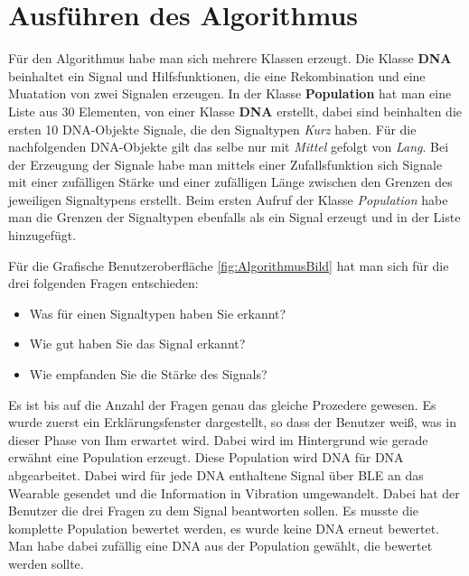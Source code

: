 \section {Ausf{\"u}hren des Algorithmus}


F{\"u}r den Algorithmus habe man sich mehrere Klassen erzeugt. 
Die Klasse \textbf{DNA} beinhaltet ein Signal und Hilfsfunktionen, die eine Rekombination und eine Muatation von zwei Signalen erzeugen.
In der Klasse \textbf{Population} hat man eine Liste aus 30 Elementen, von einer Klasse \textbf{DNA} erstellt, dabei sind beinhalten die ersten 10 DNA-Objekte Signale, die den Signaltypen \textit{Kurz} haben. F{\"u}r die nachfolgenden DNA-Objekte gilt das selbe nur mit \textit{Mittel} gefolgt von \textit{Lang}. 
Bei der Erzeugung der Signale habe man mittels einer Zufallsfunktion sich Signale mit einer zuf{\"a}lligen St{\"a}rke und einer zuf{\"a}lligen L{\"a}nge zwischen den Grenzen des jeweiligen Signaltypens erstellt. Beim ersten Aufruf der Klasse \textit{Population} habe man die Grenzen der Signaltypen ebenfalls als ein Signal erzeugt und in der Liste hinzugef{\"u}gt.

F{\"u}r die Grafische Benutzeroberfl{\"a}che \autoref{fig:AlgorithmusBild} hat man sich f{\"u}r die drei folgenden Fragen entschieden:
\begin{itemize}
\item Was f{\"u}r einen Signaltypen haben Sie erkannt?
\item Wie gut haben Sie das Signal erkannt?
\item Wie empfanden Sie die St{\"a}rke des Signals?
\end{itemize}

Es ist bis auf die Anzahl der Fragen genau das gleiche Prozedere gewesen. Es wurde zuerst ein Erkl{\"a}rungsfenster dargestellt, so dass der Benutzer wei{\ss}, was in dieser Phase von Ihm erwartet wird. 
Dabei wird im Hintergrund wie gerade erw{\"a}hnt eine Population erzeugt. Diese Population wird DNA f{\"u}r DNA abgearbeitet. Dabei wird f{\"u}r jede DNA enthaltene Signal {\"u}ber BLE an das Wearable gesendet und die Information in Vibration umgewandelt. Dabei hat der Benutzer die drei Fragen zu dem Signal beantworten sollen. 
Es musste die komplette Population bewertet werden, es wurde keine DNA erneut bewertet. Man habe dabei zuf{\"a}llig eine DNA aus der Population gew{\"a}hlt, die bewertet werden sollte.

